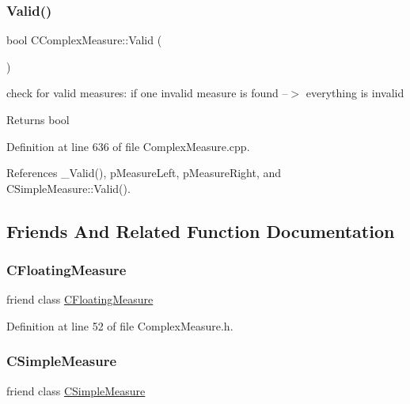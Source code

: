 \subsubsection{\texorpdfstring{Valid()}{Valid()}}
{\footnotesize\ttfamily bool C\+Complex\+Measure\+::\+Valid (\begin{DoxyParamCaption}{ }\end{DoxyParamCaption})}



check for valid measures\+: if one invalid measure is found --$>$ everything is invalid 

\begin{DoxyReturn}{Returns}
bool 
\end{DoxyReturn}


Definition at line 636 of file Complex\+Measure.\+cpp.



References \+\_\+\+Valid(), p\+Measure\+Left, p\+Measure\+Right, and C\+Simple\+Measure\+::\+Valid().



\subsection{Friends And Related Function Documentation}
\mbox{\label{classCComplexMeasure_a7e23751869edf87edc0feeb80eda78d9}} 
\subsubsection{\texorpdfstring{C\+Floating\+Measure}{CFloatingMeasure}}
{\footnotesize\ttfamily friend class \hyperlink{classCFloatingMeasure}{C\+Floating\+Measure}\hspace{0.3cm}{\ttfamily [friend]}}



Definition at line 52 of file Complex\+Measure.\+h.

\mbox{\label{classCComplexMeasure_ac06bbec937fbb103ef6191c80bfa5880}} 
\subsubsection{\texorpdfstring{C\+Simple\+Measure}{CSimpleMeasure}}
{\footnotesize\ttfamily friend class \hyperlink{classCSimpleMeasure}{C\+Simple\+Measure}\hspace{0.3cm}{\ttfamily [friend]}}



